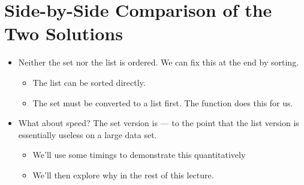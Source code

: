 \documentclass[letterpaper,10pt,english]{sphinxmanual}
\begin{document}
\section{Side-by-Side Comparison of the Two Solutions}
\label{\detokenize{lecture_notes/lec15_sets:side-by-side-comparison-of-the-two-solutions}}\begin{itemize}
\item {} 
Neither the set nor the list is ordered. We can fix this at the end by
sorting.
\begin{itemize}
\item {} 
The list can be sorted directly.

\item {} 
The set must be converted to a list first. The function 
does this for us.

\end{itemize}

\item {} 
What about speed? The set version is  — to the point
that the list version is essentially useless on a large data set.
\begin{itemize}
\item {} 
We’ll use some timings to demonstrate this quantitatively

\item {} 
We’ll then explore why in the rest of this lecture.

\end{itemize}

\end{itemize}
\end{document}
